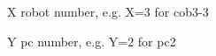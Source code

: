%
%
\markboth{\uppercase{\nomname}}{\uppercase{\nomname}}

{}
\printnomenclature%


\begin{thenomenclature}


  \item [{X}]\begingroup robot number, e.g. X=3 for cob3-3
  \item [{Y}]\begingroup pc number, e.g. Y=2 for pc2

\end{thenomenclature}
